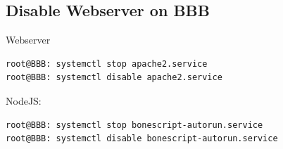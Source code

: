 \documentclass[
	fontsize=10pt
	paper=a4
]{scrartcl}
\begin{document}
\subsection{Disable Webserver on BBB}

Webserver

\begin{lstlisting}[language=bash]
root@BBB: systemctl stop apache2.service
root@BBB: systemctl disable apache2.service

\end{lstlisting}


NodeJS:


\begin{lstlisting}[language=bash]
root@BBB: systemctl stop bonescript-autorun.service
root@BBB: systemctl disable bonescript-autorun.service

\end{lstlisting}




\end{document}
